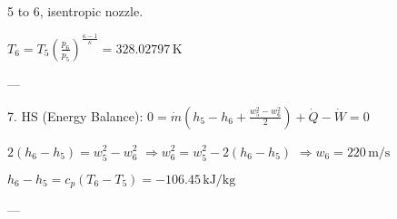 5 to 6, isentropic nozzle.  

\( T_6 = T_5 \left( \frac{p_6}{p_5} \right)^{\frac{\kappa - 1}{\kappa}} = 328.02797 \, \text{K} \)  

---

7. HS (Energy Balance):  
\( 0 = \dot{m} \left( h_5 - h_6 + \frac{w_5^2 - w_6^2}{2} \right) + \dot{Q} - \dot{W} = 0 \)  

\( 2(h_6 - h_5) = w_5^2 - w_6^2 \)  
\( \Rightarrow w_6^2 = w_5^2 - 2(h_6 - h_5) \)  
\( \Rightarrow w_6 = 220 \, \text{m/s} \)  

\( h_6 - h_5 = c_p (T_6 - T_5) = -106.45 \, \text{kJ/kg} \)  

---